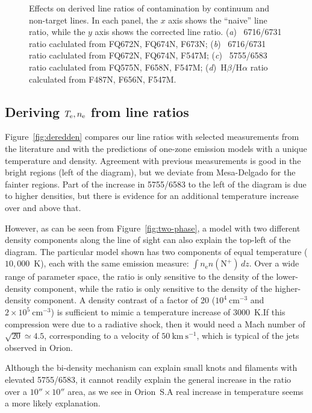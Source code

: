 \documentclass[preprint]{aastex}
\begin{document}
\begin{figure}
\begin{tabular}{ll}
  \end{tabular}
  \caption{Effects on derived line ratios of contamination by
    continuum and non-target lines.  In each panel, the \(x\) axis
    shows the ``naive'' line ratio, while the \(y\) axis shows the
    corrected line ratio.  (\textit{a})~\sii{} 6716/6731 ratio
    caclulated from FQ672N, FQ674N, F673N; (\textit{b})~\sii{} 6716/6731 ratio
    caclulated from FQ672N, FQ674N, F547M; (\textit{c})~\nii{} 5755/6583 ratio
    caclulated from  FQ575N, F658N, F547M;
    (\textit{d})~H\(\beta\)/H\(\alpha\) ratio calculated from F487N,
    F656N, F547M.}
  \label{fig:contam}
\end{figure}




\subsection{\boldmath Deriving \(T_{\mathrm{e}}, n_{\mathrm{e}}\) from line ratios}
\label{sec:derive}

Figure~\ref{fig:deredden} compares our line ratios with selected
measurements from the literature and with the predictions of one-zone
emission models with a unique temperature and density.  Agreement with
previous measurements is good in the bright regions (left of the
diagram), but we deviate from Mesa-Delgado for the fainter regions.
Part of the increase in 5755/6583 to the left of the diagram is due to
higher densities, but there is evidence for an additional temperature
increase over and above that.

However, as can be seen from Figure~\ref{fig:two-phase}, a model with
two different density components along the line of sight can also
explain the top-left of the diagram.  The particular model shown has
two components of equal temperature (\(10,000\)~K), each with the same
emission measure: \(\int n_{\mathrm{e}} n(\mathrm{N^+}) \, dz\).  Over
a wide range of parameter space, the \sii{} ratio is only sensitive to
the density of the lower-density component, while the \nii{} ratio is
only sensitive to the density of the higher-density component.  A
density contrast of a factor of 20 (\(10^4~\mathrm{cm^{-3}}\) and
\(2 \times 10^5~\mathrm{cm^{-3}}\)) is sufficient to mimic a temperature
increase of \(3000\)~K.\@   If this compression were due to a
radiative shock, then it would need a Mach number of \(\sqrt{20}
\simeq 4.5\), corresponding to a velocity of \(50~\mathrm{km\
  s^{-1}}\), which is typical of the jets observed in Orion. 

Although the bi-density mechanism can explain small knots and
filaments with elevated 5755/6583, it cannot readily explain the
general increase in the ratio over a \(10'' \times 10''\) area, as we
see in Orion~S.\@  A real increase in temperature seems a more likely
explanation.  
\end{document}
